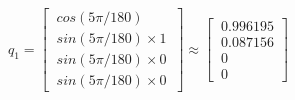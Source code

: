 \documentclass[preview]{standalone}
\begin{document}
\begin{center}
$q_1 = \begin{bmatrix}\
                    cos(5\pi/180) \\\
                    sin(5\pi/180) \times 1 \\\
                    sin(5\pi/180) \times 0 \\\
                    sin(5\pi/180) \times 0\
                \end{bmatrix} \approx \begin{bmatrix}\
                    0.996195 \\\
                    0.087156 \\\
                    0 \\\
                    0\
                \end{bmatrix}$
\end{center}
\end{document}
